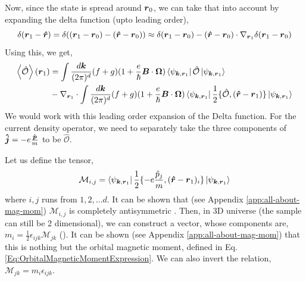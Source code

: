 \documentclass{report}
\renewcommand\vec[1]{\ensuremath\boldsymbol{#1}} %
\begin{document}
Now, since the state is spread around $\vec{r}_0$, we can take that into account by expanding the delta function (upto leading order),
$$
\delta(\vec{r}_1 - \vec{\hat{r}}) = \delta((\vec{r}_1 - \vec{r}_0) - (\vec{\hat{r}} - \vec{r}_0)) \approx \delta(\vec{r}_1 - \vec{r}_0) - (\vec{\hat{r}} - \vec{r}_0) \cdot \nabla_{\vec{r}_1} \delta(\vec{r}_1 - \vec{r}_0)
$$
Using this, we get,
\begin{equation}\label{Eq:expectation-value-of-general-operator-O}
	\begin{aligned}
	\expval{\hat{\mathcal{O}}}(\vec{r}_1) &= \int  \frac{d\vec{k}}{(2\pi)^d} (f+g) (1+\frac{e}{\hbar} \vec{B}\cdot\vec{\Omega})
	\bra{\psi_{\vec{k},\vec{r}_1}} \hat{\mathcal{O}} \ket{\psi_{\vec{k},\vec{r}_1}} \\
	& -\nabla_{\vec{r}_1} \cdot \int \frac{d\vec{k}}{(2\pi)^d} (f+g) (1+\frac{e}{\hbar} \vec{B}\cdot\vec{\Omega})
	\bra{\psi_{\vec{k},\vec{r}_1}} \frac{1}{2}\{\hat{\mathcal{O}}, (\vec{\hat{r}} - \vec{r}_1)\} \ket{\psi_{\vec{k},\vec{r}_1}} 
	\end{aligned} 
\end{equation}
We would work with this leading order expansion of the Delta function. For the current density operator, we need to separately take the three components of $\vec{\hat{j}} = -e\frac{\hat{\vec{p}}}{m}$ to be $\hat{\mathcal{O}}$.

Let us define the tensor,
$$\mathcal{M}_{i,j} = \bra{\psi_{\vec{k},\vec{r}_1}} \frac{1}{2}\{-e\frac{\hat{p}_j}{m}, (\vec{\hat{r}} - \vec{r}_1)_i\} \ket{\psi_{\vec{k},\vec{r}_1}} 
$$
where $i,j$ runs from $1,2, \dots d$. It can be shown that (see Appendix \ref{app:all-about-mag-mom}) $\mathcal{M}_{i,j}$ is completely antisymmetric \cite{PhysRevLett.124.066601}. Then, in 3D universe (the sample can still be 2 dimensional), we can construct a vector, whose components are, $m_i = \frac{1}{2} \epsilon_{ijk} \mathcal{M}_{j k}$ (\cite{PhysRevLett.124.066601}). It can be shown (see Appendix \ref{app:all-about-mag-mom}) that this is nothing but the orbital magnetic moment, defined in Eq. \eqref{Eq:OrbitalMagneticMomentExpression}. We can also invert the relation, $\mathcal{M}_{jk} = m_i \epsilon_{ijk}$.
\end{document}
